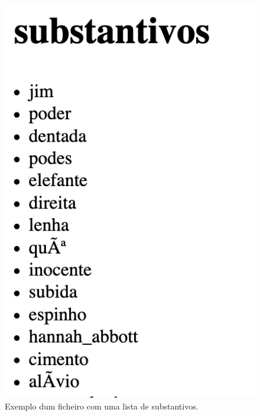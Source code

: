 \documentclass[11pt,a4paper]{report}
\begin{document}
\begin{figure}[H]
\centering
\includegraphics[scale=0.6]{substantivos.png}
\caption{Exemplo dum ficheiro com uma lista de substantivos.}
\label{img:substantivos}
\end{figure}
\end{document}
